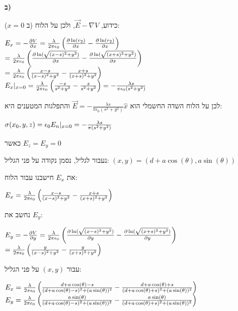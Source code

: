 \documentclass[14pt]{extarticle}
\makeatletter
\newenvironment{lefteqs}{%
    \begin{english}%
    \begin{flushleft}%
    \renewcommand{\arraystretch}{1.3}%
    $\begin{array}{@{}l@{}}%
}{%
    \end{array}$%
    \end{flushleft}%
    \end{english}%
}
\makeatother
\begin{document}
\textbf{ב)} 

כידוע, $\vec{E}-\nabla V$, ולכן על הלוח (ב $x=0$):

\begin{lefteqs}
    E_x = -\frac{\partial V}{\partial x} = \frac{\lambda}{2\pi \epsilon_0}  \left( \frac{\partial \ln(r_2)}{\partial x} - \frac{\partial \ln(r_2)}{\partial x} \right) \\
    = \frac{\lambda}{2\pi \epsilon_0} \left( \frac{\partial \ln(\sqrt{(x-s)^2 + y^2})}{\partial x} - \frac{\partial \ln(\sqrt{(x+s)^2 + y^2})}{\partial x} \right) \\
    = \frac{\lambda}{2\pi \epsilon_0} \left( \frac{x-s}{(x-s)^2 + y^2} - \frac{x+s}{(x+s)^2 + y^2} \right) \\
    E_x |_{x=0} = \frac{\lambda}{2\pi \epsilon_0} \left( \frac{-s}{s^2 + y^2} - \frac{s}{s^2 + y^2} \right) = -\frac{\lambda s}{\pi \epsilon_0 (s^2 + y^2)} \\
\end{lefteqs}
לכן על הלוח השדה החשמלי הוא $\vec{E} = -\frac{\lambda s}{\pi \epsilon_0 (s^2 + y^2)} \hat{x}$ והתפלגות המטענים היא:
\begin{lefteqs}
    \sigma(x_0,y,z) = \epsilon_0 E_n |_{x=0} = -\frac{\lambda s}{\pi (s^2 + y^2)}
\end{lefteqs}

כאשר $E_z=E_y=0$

נעבור לגליל, נסמן נקודה על פני הגליל: $(x,y)=(d+a\cos(\theta), a\sin(\theta))$

את $E_x$ חישבנו עבור הלוח:

\begin{lefteqs}
    E_x = \frac{\lambda}{2\pi \epsilon_0} \left( \frac{x-s}{(x-s)^2 + y^2} - \frac{x+s}{(x+s)^2 + y^2} \right) \\
\end{lefteqs}

נחשב את $E_y$:

\begin{lefteqs}
    E_y = -\frac{\partial V}{\partial y} = \frac{\lambda}{2\pi \epsilon_0} \left( \frac{\partial \ln(\sqrt{(x-s)^2 + y^2})}{\partial y} - \frac{\partial \ln(\sqrt{(x+s)^2 + y^2})}{\partial y} \right) \\
    = \frac{\lambda}{2\pi \epsilon_0} \left( \frac{y}{(x-s)^2 + y^2} - \frac{y}{(x+s)^2 + y^2} \right) \\
\end{lefteqs}

עבור $(x,y)$ על פני הגליל:

\begin{lefteqs}
    E_x = \frac{\lambda}{2\pi \epsilon_0} \left( \frac{d+a\cos(\theta) -s}{(d+a\cos(\theta)-s)^2 + (a\sin(\theta))^2} - \frac{d+a\cos(\theta) +s}{(d+a\cos(\theta)+s)^2 + (a\sin(\theta))^2} \right) \\
    E_y = \frac{\lambda}{2\pi \epsilon_0} \left( \frac{a\sin(\theta)}{(d+a\cos(\theta)-s)^2 + (a\sin(\theta))^2} - \frac{a\sin(\theta)}{(d+a\cos(\theta)+s)^2 + (a\sin(\theta))^2} \right) \\
\end{lefteqs}
\end{document}

